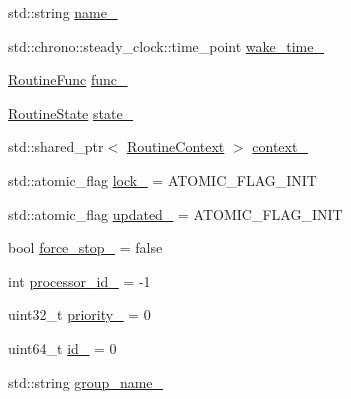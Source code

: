 \begin{DoxyCompactItemize}
\item 
std\-::string \hyperlink{classapollo_1_1cyber_1_1croutine_1_1CRoutine_a1a5fc3c9a9e30f211a92a89763d2cbab}{name\-\_\-}
\item 
std\-::chrono\-::steady\-\_\-clock\-::time\-\_\-point \hyperlink{classapollo_1_1cyber_1_1croutine_1_1CRoutine_abd2684b9c1a6fcbbe4afcc1b5f8b6ccc}{wake\-\_\-time\-\_\-}
\item 
\hyperlink{namespaceapollo_1_1cyber_1_1croutine_a5c1d994c8a08504b270fd8c4ba57d282}{Routine\-Func} \hyperlink{classapollo_1_1cyber_1_1croutine_1_1CRoutine_a35c97acd271cbe079df11e4b4490b729}{func\-\_\-}
\item 
\hyperlink{namespaceapollo_1_1cyber_1_1croutine_a9b2ec600d9734ed2e857a7235cec5e48}{Routine\-State} \hyperlink{classapollo_1_1cyber_1_1croutine_1_1CRoutine_a50f7996bfdacc4455012d2701b91890e}{state\-\_\-}
\item 
std\-::shared\-\_\-ptr$<$ \hyperlink{structapollo_1_1cyber_1_1croutine_1_1RoutineContext}{Routine\-Context} $>$ \hyperlink{classapollo_1_1cyber_1_1croutine_1_1CRoutine_a68165b138d7cfc1b200e830970ad3289}{context\-\_\-}
\item 
std\-::atomic\-\_\-flag \hyperlink{classapollo_1_1cyber_1_1croutine_1_1CRoutine_a1fc4d2d426dba2b0e4381e67348869ae}{lock\-\_\-} = A\-T\-O\-M\-I\-C\-\_\-\-F\-L\-A\-G\-\_\-\-I\-N\-I\-T
\item 
std\-::atomic\-\_\-flag \hyperlink{classapollo_1_1cyber_1_1croutine_1_1CRoutine_a1f4f88bf13f02aa9d963159db66570ad}{updated\-\_\-} = A\-T\-O\-M\-I\-C\-\_\-\-F\-L\-A\-G\-\_\-\-I\-N\-I\-T
\item 
bool \hyperlink{classapollo_1_1cyber_1_1croutine_1_1CRoutine_ae4784009fb5e1cc2ea1c71739af50fd5}{force\-\_\-stop\-\_\-} = false
\item 
int \hyperlink{classapollo_1_1cyber_1_1croutine_1_1CRoutine_a9d05239ef9bdf626d9044a2cbae13485}{processor\-\_\-id\-\_\-} = -\/1
\item 
uint32\-\_\-t \hyperlink{classapollo_1_1cyber_1_1croutine_1_1CRoutine_a0e6d7a63a90b8c53f1001d9e75015fdc}{priority\-\_\-} = 0
\item 
uint64\-\_\-t \hyperlink{classapollo_1_1cyber_1_1croutine_1_1CRoutine_abbd791fd6d8e2aa9a996fdd2bf221cf7}{id\-\_\-} = 0
\item 
std\-::string \hyperlink{classapollo_1_1cyber_1_1croutine_1_1CRoutine_ada07af0832975eb46a12f4b84ff022d0}{group\-\_\-name\-\_\-}
\end{DoxyCompactItemize}
